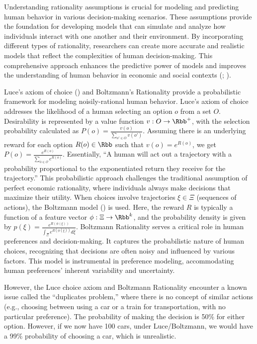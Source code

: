 \documentclass[
  letterpaper,
  DIV=11,
  numbers=noendperiod,
  oneside]{scrreprt}
\theoremstyle{remark}
\begin{document}
Understanding rationality assumptions is crucial for modeling and
predicting human behavior in various decision-making scenarios. These
assumptions provide the foundation for developing models that can
simulate and analyze how individuals interact with one another and their
environment. By incorporating different types of rationality,
researchers can create more accurate and realistic models that reflect
the complexities of human decision-making. This comprehensive approach
enhances the predictive power of models and improves the understanding
of human behavior in economic and social contexts
(;
).

Luce's axiom of choice () and
Boltzmann's Rationality provide a probabilistic framework for modeling
noisily-rational human behavior. Luce's axiom of choice addresses the
likelihood of a human selecting an option \(o\) from a set \(O\).
Desirability is represented by a value function
\(v : O \rightarrow \Rbb^+\), with the selection probability calculated
as \(P(o) = \frac{v(o)}{\sum_{o' \in O} v(o')}\). Assuming there is an
underlying reward for each option \(R(o) \in \Rbb\) such that
\(v(o) = e^{R(o)}\), we get
\(P(o) = \frac{e^{R(o)}}{\sum_{\bar{o} \in \mathcal{O}} e^{R(\bar{o})}}\).
Essentially, ``A human will act out a trajectory with a probability
proportional to the exponentiated return they receive for the
trajectory.'' This probabilistic approach challenges the traditional
assumption of perfect economic rationality, where individuals always
make decisions that maximize their utility. When choices involve
trajectories \(\xi \in \Xi\) (sequences of actions), the Boltzmann model
()
is used. Here, the reward \(R\) is typically a function of a feature
vector \(\phi : \Xi \rightarrow \Rbb^k\), and the probability density is
given by
\(p(\xi) = \frac{e^{R(\phi(\xi))}}{\int_{\Xi} e^{R(\phi(\bar{\xi}))} d\bar{\xi}}\).
Boltzmann Rationality serves a critical role in human preferences and
decision-making. It captures the probabilistic nature of human choices,
recognizing that decisions are often noisy and influenced by various
factors. This model is instrumental in preference modeling,
accommodating human preferences' inherent variability and uncertainty.

However, the Luce choice axiom and Boltzmann Rationality encounter a
known issue called the ``duplicates problem,'' where there is no concept
of similar actions (e.g., choosing between using a car or a train for
transportation, with no particular preference). The probability of
making the decision is 50\% for either option. However, if we now have
100 cars, under Luce/Boltzmann, we would have a 99\% probability of
choosing a car, which is unrealistic.
\end{document}
